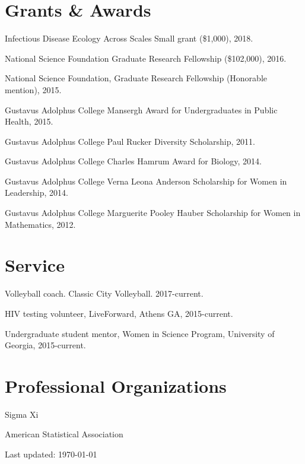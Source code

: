 \documentclass[letterpaper]{article}
\def\footerlink{}
\renewenvironment{itemize}{
  \begin{list}{}{
    \setlength{\leftmargin}{1.5em}
  }
}{
  \end{list}
}
\begin{document}
\section*{Grants \& Awards}

\begin{itemize}
\item Infectious Disease Ecology Across Scales Small grant (\$1,000), 2018. 
\item National Science Foundation Graduate Research Fellowship (\$102,000), 2016. 
\item National Science Foundation, Graduate Research Fellowship (Honorable mention), 2015.
\item Gustavus Adolphus College Mansergh Award for Undergraduates in Public Health, 2015.
\item Gustavus Adolphus College Paul Rucker Diversity Scholarship, 2011.
\item Gustavus Adolphus College Charles Hamrum Award for Biology, 2014.
\item Gustavus Adolphus College Verna Leona Anderson Scholarship for Women in Leadership, 2014. 
\item Gustavus Adolphus College Marguerite Pooley Hauber Scholarship for Women in Mathematics, 2012. 
\end{itemize}

\section*{Service}
\begin{itemize}
\item Volleyball coach. Classic City Volleyball. 2017-current. 
\item HIV testing volunteer, LiveForward, Athens GA, 2015-current. 
\item Undergraduate student mentor, Women in Science Program, University of Georgia, 2015-current. 
\end{itemize}

\section*{Professional Organizations}
\begin{itemize}
\item Sigma Xi
\item American Statistical Association
\end{itemize}

\bigskip

\begin{center}
  \begin{footnotesize}
    Last updated: \today \\
    \href{\footerlink}{\texttt{\footerlink}}
  \end{footnotesize}
\end{center}
\end{document}
